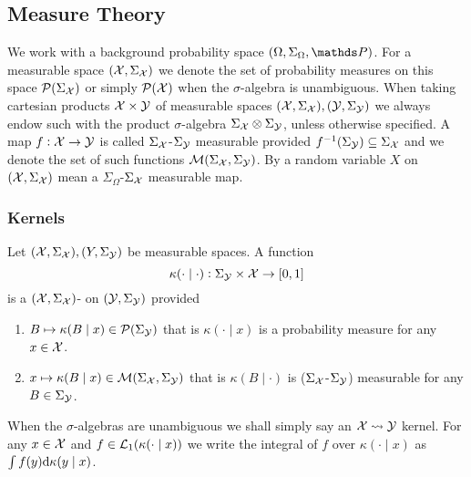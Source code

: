 
\subsection{Measure Theory}

We work with a background probability space $(\Omega, \Sigma_\Omega, \Prob)$.
For a measurable space $(\mathcal{X}, \Sigma_{\mathcal{X}})$ we denote
the set of probability measures on this space $\mathcal{P}(\Sigma_\mathcal{X})$ or
simply $\mathcal{P}(\mathcal{X})$ when the $\sigma$-algebra is unambiguous.
When taking cartesian products $\mathcal{X} \times \mathcal{Y}$ of measurable spaces
$(\mathcal{X}, \Sigma_\mathcal{X}), (\mathcal{Y}, \Sigma_\mathcal{Y})$ we always endow such
with the product $\sigma$-algebra $\Sigma_\mathcal{X} \otimes \Sigma_\mathcal{Y}$,
unless otherwise specified.
A map $f: \mathcal{X} \to \mathcal{Y}$ is called $\Sigma_{\mathcal{X}}$-$\Sigma_{\mathcal{Y}}$
measurable provided $f^{-1}(\Sigma_{\mathcal{Y}}) \subseteq \Sigma_{\mathcal{X}}$
and we denote the set of such functions $\mathcal{M}(\Sigma_{\mathcal{X}},
\Sigma_{\mathcal{Y}})$.
By a random variable $X$ on $(\mathcal{X}, \Sigma_{\mathcal{X}})$ mean a
$\Sigma_\Omega$-$\Sigma_{\mathcal{X}}$ measurable map.

\subsubsection{Kernels}

\begin{defn}
  Let $(\mathcal{X}, \Sigma_\mathcal{X}), (Y, \Sigma_\mathcal{Y})$ be measurable spaces.
  A function
  \[ \kappa(\cdot \mid \cdot) : \Sigma_\mathcal{Y} \times \mathcal{X} \to [0,1] \]
  is a $(\mathcal{X}, \Sigma_\mathcal{X})$-
  on $(\mathcal{Y}, \Sigma_\mathcal{Y})$ provided
  \begin{enumerate}
    \item $B \mapsto \kappa(B \mid x) \in \mathcal{P}(\Sigma_\mathcal{Y})$
      that is $\kappa(\cdot \mid x)$ is a probability measure
      for any $x \in \mathcal{X}$.
    \item
      $x \mapsto \kappa(B \mid x) \in \mathcal{M}(\Sigma_\mathcal{X}, \Sigma_\mathcal{Y})$
      that is $\kappa(B \mid \cdot)$ is ($\Sigma_\mathcal{X}$-$\Sigma_\mathcal{Y}$)
      measurable for any $B \in \Sigma_\mathcal{Y}$.
  \end{enumerate}
  When the $\sigma$-algebras are unambiguous we shall simply say an
  $\mathcal{X} \leadsto \mathcal{Y}$ kernel.
  For any $x \in \mathcal{X}$ and $f \in \mathcal{L}_1(\kappa(\cdot \mid x))$
  we write the integral of $f$ over $\kappa(\cdot \mid x)$ as
  $\int f(y) \mathrm{d} \kappa(y \mid x)$.
  \label{defn:probKer}
\end{defn}

